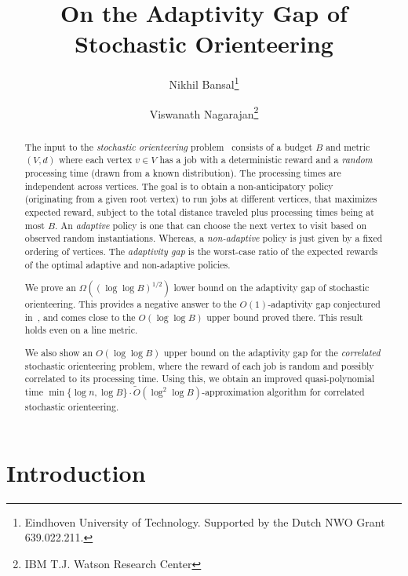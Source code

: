 \documentclass[11pt,letterpaper]{article}
\numberwithin{algorithm}{section}
\begin{document}
\title{On the Adaptivity Gap of Stochastic Orienteering}
\author{
Nikhil Bansal\thanks{Eindhoven University of Technology. Supported by the Dutch NWO Grant 639.022.211.}
\and
Viswanath Nagarajan\thanks{IBM T.J. Watson Research Center}
}
\date{}

\maketitle

\begin{abstract}
The input to the {\em stochastic orienteering} problem~\cite{GKNR12} consists of a budget $B$ and metric $(V,d)$ where each vertex $v\in V$ has a job with a deterministic reward and a \emph{random} processing time (drawn from a known distribution). The processing times are independent across vertices. The goal is to obtain a non-anticipatory policy  (originating from a given root vertex)
to run jobs at different vertices, that maximizes expected reward, subject to the total distance traveled plus processing times being at most $B$. An {\em adaptive} policy is one that can choose the next vertex to visit based on observed random instantiations. Whereas, a {\em non-adaptive} policy is just given by a fixed ordering of vertices.
The {\em adaptivity gap} is the worst-case ratio of the expected rewards of the optimal adaptive and non-adaptive policies.

\smallskip

We prove an $\Omega\left((\log\log B)^{1/2}\right)$ lower bound on the adaptivity gap of stochastic orienteering. This provides a negative answer to the $O(1)$-adaptivity gap conjectured in~\cite{GKNR12}, and comes close to the $O(\log\log B)$ upper bound proved there. This result holds even on a line metric.


\smallskip

We also show an $O(\log\log B)$ upper bound on the adaptivity gap for the {\em correlated} stochastic orienteering problem, where the reward of each job is random and possibly correlated to its processing time. Using this, we obtain an improved quasi-polynomial time $ \min\{\log n,\log B\}\cdot \tilde{O}(\log^2\log B)$-approximation algorithm for correlated stochastic orienteering.

\end{abstract}

\section{Introduction}
\end{document}
